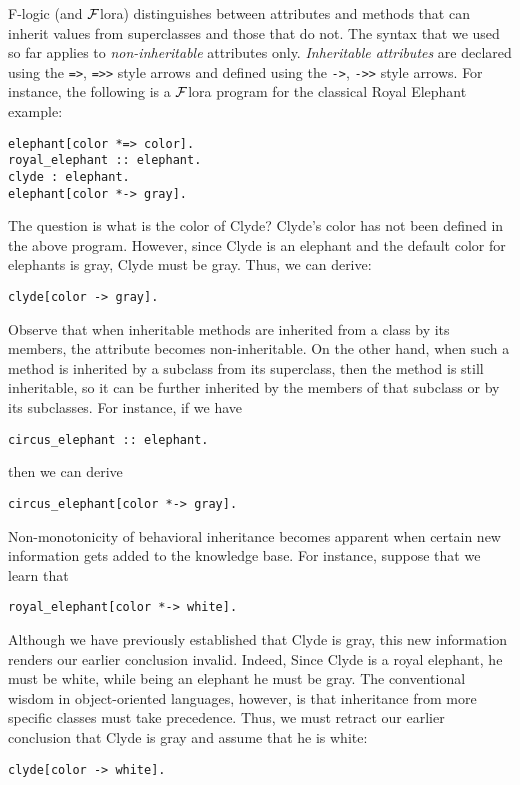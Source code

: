 \documentclass[11pt]{article}
\newcommand{\FLORA}{{\mbox{${\cal F}${\sc lora}}}\xspace}
\begin{document}
F-logic (and \FLORA) distinguishes between attributes and methods that can
inherit values from superclasses and those that do not. The syntax that we
used so far applies to \emph{non-inheritable} attributes only.
\emph{Inheritable attributes} are declared using the {\tt *=>}, {\tt *=>>}
style arrows and defined using the {\tt *->}, {\tt *->>} style arrows. For
instance, the following is a \FLORA program for the classical Royal
Elephant example:
\begin{verbatim}
elephant[color *=> color].
royal_elephant :: elephant.
clyde : elephant.
elephant[color *-> gray].
\end{verbatim}
The question is what is the color of Clyde?
Clyde's color has not been defined in the above program. However, since
Clyde is an elephant and the default color for elephants is gray, Clyde
must be gray. Thus, we can derive:
\begin{verbatim}
clyde[color -> gray].  
\end{verbatim}
Observe that when inheritable methods are inherited from a class by its
members, the attribute becomes non-inheritable. On the other hand, when
such a method is inherited by a subclass from its superclass, then the
method is still inheritable, so it can be further inherited by the members
of that subclass or by its subclasses. For instance, if we have
\begin{verbatim}
circus_elephant :: elephant.
\end{verbatim}
then we can derive 
\begin{verbatim}
circus_elephant[color *-> gray].  
\end{verbatim}

Non-monotonicity of behavioral inheritance becomes apparent when certain new
information gets added to the knowledge base. For instance, suppose that we
learn that
\begin{verbatim}
royal_elephant[color *-> white].  
\end{verbatim}
Although we have previously established that Clyde is gray, this new
information renders our earlier conclusion invalid. Indeed,
Since Clyde is a royal elephant, he must be white, while being an elephant
he must be gray.
The conventional wisdom in object-oriented languages, however, is that
inheritance from more specific classes must take precedence. Thus, we must
retract our earlier conclusion that Clyde is gray and assume that he is white:
\begin{verbatim}
clyde[color -> white].    
\end{verbatim}
\end{document}
